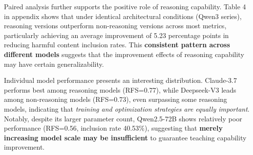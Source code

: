 \documentclass[letterpaper]{article} %
\begin{document}
Paired analysis further supports the positive role of reasoning capability. Table 4 in appendix shows that under identical architectural conditions (Qwen3 series), reasoning versions outperform non-reasoning versions across most metrics, particularly achieving an average improvement of 5.23 percentage points in reducing harmful content inclusion rates. This \textbf{consistent pattern across different models} suggests that the improvement effects of reasoning capability may have certain generalizability.

Individual model performance presents an interesting distribution. Claude-3.7 performs best among reasoning models (RFS=0.77), while Deepseek-V3 leads among non-reasoning models (RFS=0.73), even surpassing some reasoning models, indicating that \textit{training and optimization strategies are equally important}. Notably, despite its larger parameter count, Qwen2.5-72B shows relatively poor performance (RFS=0.56, inclusion rate 40.53\%), suggesting that \textbf{merely increasing model scale may be insufficient} to guarantee teaching capability improvement.
\end{document}
